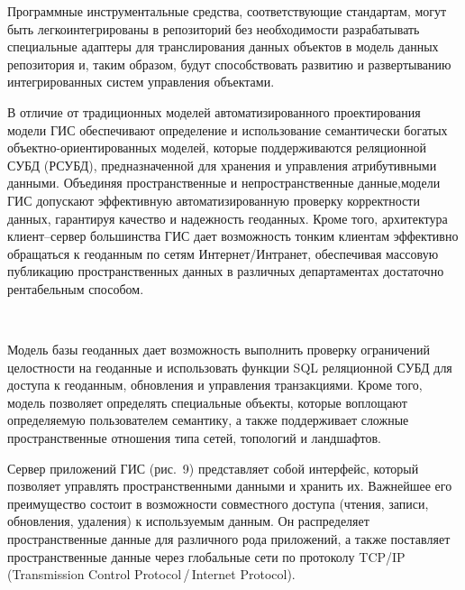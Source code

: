 \begin{multicols}{2}
Программные инструментальные средства, 
соответствующие стандартам, могут быть легко\linebreak интегрированы в репозиторий без 
необходимости разрабатывать специальные адаптеры для транслирования данных 
объектов в модель данных репозитория и, таким образом, будут способствовать развитию 
и развертыванию интегрированных систем управления объектами.
      
      В отличие от традиционных моделей автома\-тизированного проектирования 
модели ГИС обеспе\-чи\-вают определение и использование семантически богатых 
      объект\-но-ори\-ен\-ти\-ро\-ван\-ных моделей, которые поддерживаются реляционной СУБД 
(РСУБД), предназначенной для хранения и управ\-ле\-ния атрибутивными данными. 
Объединяя пространственные и непространственные данные,\linebreak модели ГИС допускают 
эффективную автоматизированную проверку корректности данных, гарантируя качество и 
надежность геоданных. Кроме того, архитектура кли\-ент--сер\-вер большинства ГИС дает 
возможность тонким клиентам эффективно обращаться к геоданным по сетям 
Интернет/Интранет, обеспечивая массовую публикацию пространственных данных в 
различных департаментах достаточно рентабельным способом. 


\begin{figure*} %
 \vspace*{1pt}
 \begin{center}
 \mbox{%
 \epsfxsize=135.585mm
 }
 \end{center}
 \vspace*{-9pt}
\vspace*{6pt}
\end{figure*}                    
      
      Модель базы геоданных дает возможность выполнить проверку ограничений 
целостности на геоданные и использовать функции SQL реляционной СУБД для доступа к 
геоданным, обновления и управ\-ле\-ния транзакциями. Кроме того, модель позволяет 
определять специальные объекты, которые воплощают определяемую пользователем 
семантику, а также поддерживает сложные пространственные отношения типа сетей, 
топологий и ландшафтов. 
     
     Сервер приложений ГИС (рис.~9) представляет собой интерфейс, который 
позволяет управлять пространственными данными и хранить их. Важнейшее его 
преимущество состоит в возможности совместного доступа (чтения, записи, 
обновления, удаления) к используемым данным. Он распределяет пространственные 
данные для различного рода приложений, а также поставляет пространственные данные 
через глобальные сети по протоколу TCP/IP (Transmission Control Protocol\,/\,Internet
Protocol). 
     

\end{multicols}
